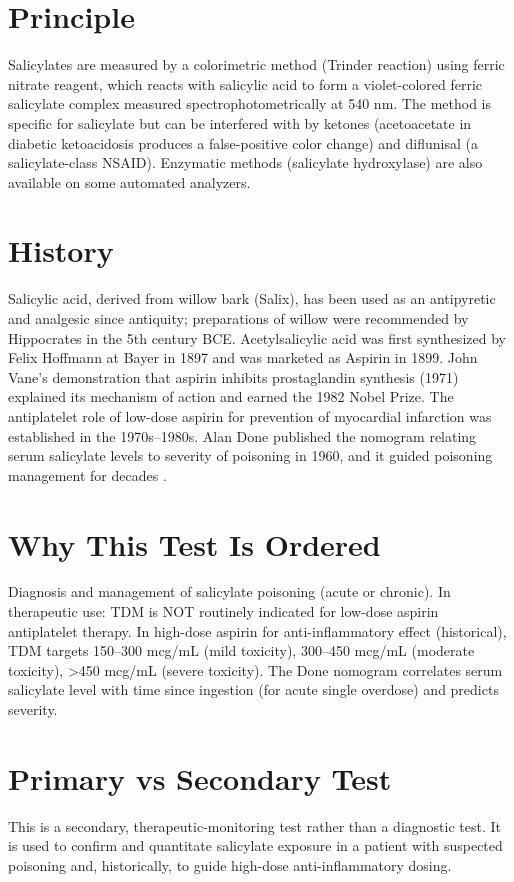 \section*{Principle}
Salicylates are measured by a colorimetric method (Trinder reaction) using ferric nitrate reagent, which reacts with salicylic acid to form a violet-colored ferric salicylate complex measured spectrophotometrically at 540 nm. The method is specific for salicylate but can be interfered with by ketones (acetoacetate in diabetic ketoacidosis produces a false-positive color change) and diflunisal (a salicylate-class NSAID). Enzymatic methods (salicylate hydroxylase) are also available on some automated analyzers.
\section*{History}
Salicylic acid, derived from willow bark (Salix), has been used as an antipyretic and analgesic since antiquity; preparations of willow were recommended by Hippocrates in the 5th century BCE. Acetylsalicylic acid was first synthesized by Felix Hoffmann at Bayer in 1897 and was marketed as Aspirin in 1899. John Vane's demonstration that aspirin inhibits prostaglandin synthesis (1971) explained its mechanism of action and earned the 1982 Nobel Prize. The antiplatelet role of low-dose aspirin for prevention of myocardial infarction was established in the 1970s--1980s. Alan Done published the nomogram relating serum salicylate levels to severity of poisoning in 1960, and it guided poisoning management for decades \cite{done1960salicylate}.
\section*{Why This Test Is Ordered}
Diagnosis and management of salicylate poisoning (acute or chronic). In therapeutic use: TDM is NOT routinely indicated for low-dose aspirin antiplatelet therapy. In high-dose aspirin for anti-inflammatory effect (historical), TDM targets 150--300 mcg/mL (mild toxicity), 300--450 mcg/mL (moderate toxicity), >450 mcg/mL (severe toxicity). The Done nomogram correlates serum salicylate level with time since ingestion (for acute single overdose) and predicts severity.
\section*{Primary vs Secondary Test}
This is a secondary, therapeutic-monitoring test rather than a diagnostic test. It is used to confirm and quantitate salicylate exposure in a patient with suspected poisoning and, historically, to guide high-dose anti-inflammatory dosing.

